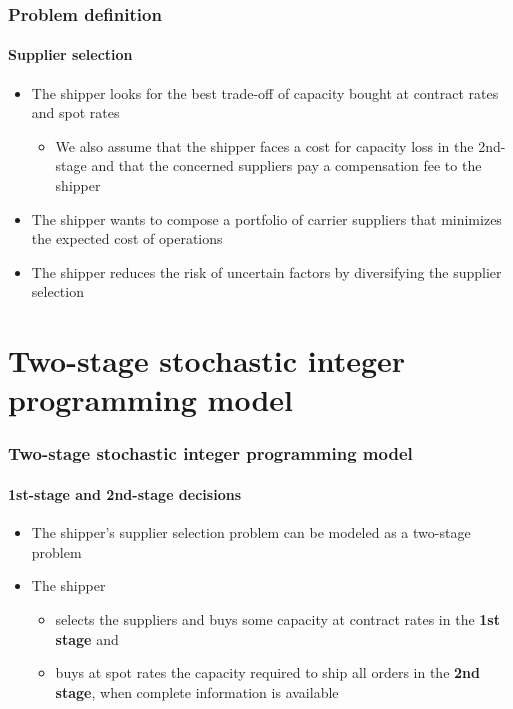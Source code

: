 \documentclass[,9pt,xcolor={dvipsnames}]{beamer} %
\begin{document}
\begin{frame}%
	\frametitle{Problem definition}
	\framesubtitle{Supplier selection}
	\begin{itemize}
		\item<1-> The shipper looks for the best trade-off of capacity bought at contract rates and spot rates
		\begin{itemize}
			\footnotesize
			\item<2-> We also assume that the shipper faces a cost for capacity loss in the 2nd-stage and that the concerned suppliers pay a compensation fee to the shipper
		\end{itemize}
		\bigskip
		\item<3-> The shipper wants to compose a portfolio of carrier suppliers that minimizes the expected cost of operations
		\bigskip
		\item<4-> The shipper reduces the risk of uncertain factors by diversifying the supplier selection
	\end{itemize}
\end{frame}

\section{Two-stage stochastic integer programming model}
\begin{frame}%
	\frametitle{Two-stage stochastic integer programming model}
	\framesubtitle{1st-stage and 2nd-stage decisions}
	\begin{itemize}
		\item<1-> The shipper's supplier selection problem can be modeled as a two-stage problem
		\bigskip
		\item<2-> The shipper
		\bigskip
		\begin{itemize}
		\item<2-> selects the suppliers and buys some capacity at contract rates in the \textbf{1st stage} and
		\bigskip
		\item<3-> buys at spot rates the capacity required to ship all orders in the \textbf{2nd stage}, when complete information is available
		\end{itemize}
	\end{itemize}
\end{frame}
\end{document}
